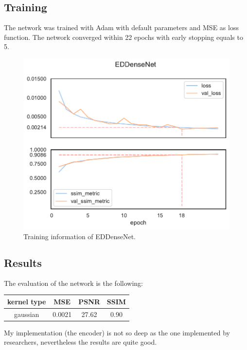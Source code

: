 \subsection{Training}
The network was trained with Adam\cite{adam} with default parameters and MSE as loss function.
The network converged within 22 epochs with early stopping equals to 5.
\begin{figure}[H]
    \centering
    \includegraphics[height=0.4\textheight,keepaspectratio]{subsections/densenet/plot_history_EDDenseNet.pdf}
    \caption{Training information of EDDenseNet.}
\end{figure}        

\subsection{Results}
The evaluation of the network is the following:
\begin{center}
    \small
    \begin{tabularx}{165pt}{c|ccc}
        \centering
        kernel type & MSE & PSNR & SSIM \\
        \hline
        gaussian & 0.0021 & 27.62 & 0.90
    \end{tabularx}        
\end{center}

My implementation (the encoder) is not so deep as the one implemented by researchers, nevertheless the results are quite good.

